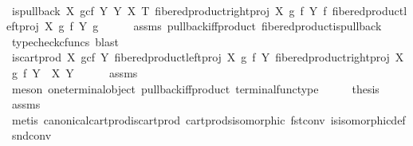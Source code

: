 \begin{isabellebody}
\ \ \isamarkupfalse%
\ {\isachardoublequoteopen}{\isacharparenleft}{\kern0pt}is{\isacharunderscore}{\kern0pt}pullback\ {\isacharparenleft}{\kern0pt}X\ \isactrlbsub g\isactrlesub {\isasymtimes}\isactrlsub c\isactrlbsub f\isactrlesub \ Y{\isacharparenright}{\kern0pt}\ Y\ X\ T\ {\isacharparenleft}{\kern0pt}fibered{\isacharunderscore}{\kern0pt}product{\isacharunderscore}{\kern0pt}right{\isacharunderscore}{\kern0pt}proj\ X\ g\ f\ Y{\isacharparenright}{\kern0pt}\ f\ {\isacharparenleft}{\kern0pt}fibered{\isacharunderscore}{\kern0pt}product{\isacharunderscore}{\kern0pt}left{\isacharunderscore}{\kern0pt}proj\ X\ g\ f\ Y{\isacharparenright}{\kern0pt}\ g{\isacharparenright}{\kern0pt}{\isachardoublequoteclose}\isanewline
\ \ \ \ \isamarkupfalse%
\ assms\ pullback{\isacharunderscore}{\kern0pt}iff{\isacharunderscore}{\kern0pt}product\ fibered{\isacharunderscore}{\kern0pt}product{\isacharunderscore}{\kern0pt}is{\isacharunderscore}{\kern0pt}pullback\ \isamarkupfalse%
\ {\isacharparenleft}{\kern0pt}typecheck{\isacharunderscore}{\kern0pt}cfuncs{\isacharcomma}{\kern0pt}\ blast{\isacharparenright}{\kern0pt}\isanewline
\ \ \isamarkupfalse%
\ \isamarkupfalse%
\ {\isachardoublequoteopen}{\isacharparenleft}{\kern0pt}is{\isacharunderscore}{\kern0pt}cart{\isacharunderscore}{\kern0pt}prod\ {\isacharparenleft}{\kern0pt}X\ \isactrlbsub g\isactrlesub {\isasymtimes}\isactrlsub c\isactrlbsub f\isactrlesub \ Y{\isacharparenright}{\kern0pt}\ {\isacharparenleft}{\kern0pt}fibered{\isacharunderscore}{\kern0pt}product{\isacharunderscore}{\kern0pt}left{\isacharunderscore}{\kern0pt}proj\ X\ g\ f\ Y{\isacharparenright}{\kern0pt}\ {\isacharparenleft}{\kern0pt}fibered{\isacharunderscore}{\kern0pt}product{\isacharunderscore}{\kern0pt}right{\isacharunderscore}{\kern0pt}proj\ X\ g\ f\ Y{\isacharparenright}{\kern0pt}\ \ X\ Y{\isacharparenright}{\kern0pt}{\isachardoublequoteclose}\isanewline
\ \ \ \ \isamarkupfalse%
\ assms\ \isamarkupfalse%
\ {\isacharparenleft}{\kern0pt}meson\ one{\isacharunderscore}{\kern0pt}terminal{\isacharunderscore}{\kern0pt}object\ pullback{\isacharunderscore}{\kern0pt}iff{\isacharunderscore}{\kern0pt}product\ terminal{\isacharunderscore}{\kern0pt}func{\isacharunderscore}{\kern0pt}type{\isacharparenright}{\kern0pt}\isanewline
\ \ \isamarkupfalse%
\ \isamarkupfalse%
\ {\isacharquery}{\kern0pt}thesis\isanewline
\ \ \ \ \isamarkupfalse%
\ assms\ \isamarkupfalse%
\ {\isacharparenleft}{\kern0pt}metis\ canonical{\isacharunderscore}{\kern0pt}cart{\isacharunderscore}{\kern0pt}prod{\isacharunderscore}{\kern0pt}is{\isacharunderscore}{\kern0pt}cart{\isacharunderscore}{\kern0pt}prod\ cart{\isacharunderscore}{\kern0pt}prods{\isacharunderscore}{\kern0pt}isomorphic\ fst{\isacharunderscore}{\kern0pt}conv\ is{\isacharunderscore}{\kern0pt}isomorphic{\isacharunderscore}{\kern0pt}def\ snd{\isacharunderscore}{\kern0pt}conv{\isacharparenright}{\kern0pt}\isanewline

\end{isabellebody}
